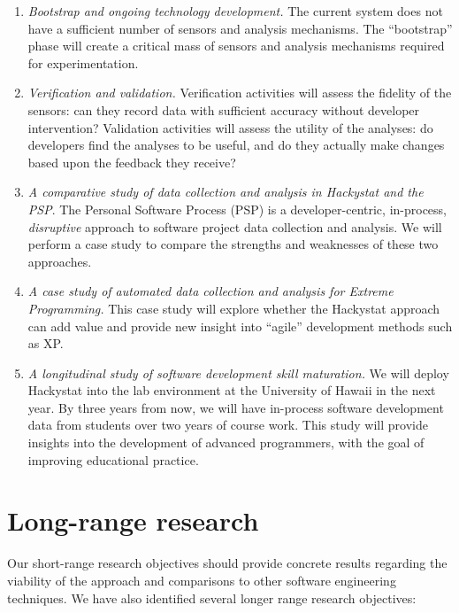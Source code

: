 \begin{enumerate}
  
\item {\em Bootstrap and ongoing technology development.}  The current
  system does not have a sufficient number of sensors and analysis
  mechanisms. The ``bootstrap'' phase will create a critical mass of
  sensors and analysis mechanisms required for experimentation. 
  
\item {\em Verification and validation.}  Verification activities will assess
the fidelity of the sensors: can they record data with sufficient accuracy
without developer intervention? Validation activities will assess the utility of
the analyses: do developers find the analyses to be useful, and do they
actually make changes based upon the feedback they receive?
  
\item {\em A comparative study of data collection and analysis in Hackystat
    and the PSP}.  The Personal Software Process (PSP) is a
  developer-centric, in-process, {\em disruptive} approach to software
  project data collection and analysis.  We will perform a case study to
  compare the strengths and weaknesses of these two approaches.

\item {\em A case study of automated data collection and analysis for
Extreme Programming.} This case study will explore whether the Hackystat
approach can add value and provide new insight into ``agile''
development methods such as XP.

\item {\em A longitudinal study of software development skill maturation.}
  We will deploy Hackystat into the lab environment at the University of
  Hawaii in the next year. By three years from now, we will have
  in-process software development data from students over two years of
  course work.  This study will provide insights into the development of
  advanced programmers, with the goal of improving educational practice.

\end{enumerate}  
 

\section*{Long-range research}

Our short-range research objectives should provide concrete results
regarding the viability of the approach and comparisons to other 
software engineering techniques. We have also identified several 
longer range research objectives:

